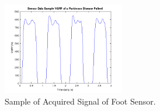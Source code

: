 \documentclass[10pt, conference, compsocconf]{IEEEtran}
\begin{document}
\begin{figure}[!htb]
	\centering
	\includegraphics[width=0.475\textwidth]{img/sampleRawData.png}
	\caption{Sample of Acquired Signal of Foot Sensor.}
	\label{fig:peakvalley}
\end{figure}




\end{document}
